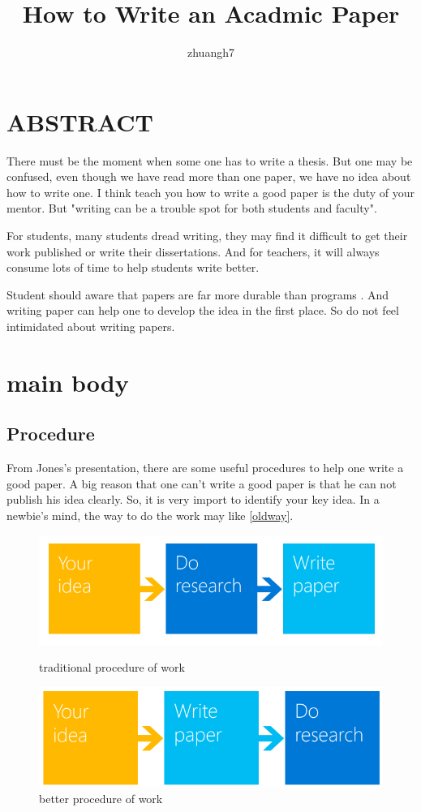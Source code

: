 \documentclass{article}
\author{zhuangh7}
\title{How to Write an Acadmic Paper}
\begin{document}
\maketitle
\section{ABSTRACT}
There must be the moment when some one has to write a thesis.
But one may be confused, even though we have read more than one paper, 
we have no idea about how to write one.
I think teach you how to write a good paper is the duty of your mentor.
But "writing can be a trouble spot for both students and faculty"\cite{LearnIn2Hours}.

For students, many students dread writing, they may find it difficult to get their work published 
or write their dissertations.
And for teachers, it will always consume lots of time to help students write better.

Student should aware that papers are far more durable than programs \cite{AGreatResearchPaper}.
And writing paper can help one to develop the idea in the first place.
So do not feel intimidated about writing papers.


\section{main body}
\subsection{Procedure}
From Jones's\cite{AGreatResearchPaper} presentation, 
there are some useful procedures to help one write a good paper.
A big reason that one can't write a good paper is that he can not publish his idea clearly.
So, it is very import to identify your key idea.
In a newbie's mind, the way to do the work may like \ref{oldway}.

\begin{figure}[]
    \centering
    \includegraphics[width=1\textwidth]{1.png}    
    \caption{traditional procedure of work}
    \label{oldway}
    \includegraphics[width=1\textwidth]{2.png}    
    \caption{better procedure of work}
    \label{newway}
\end{figure}
\end{document}
